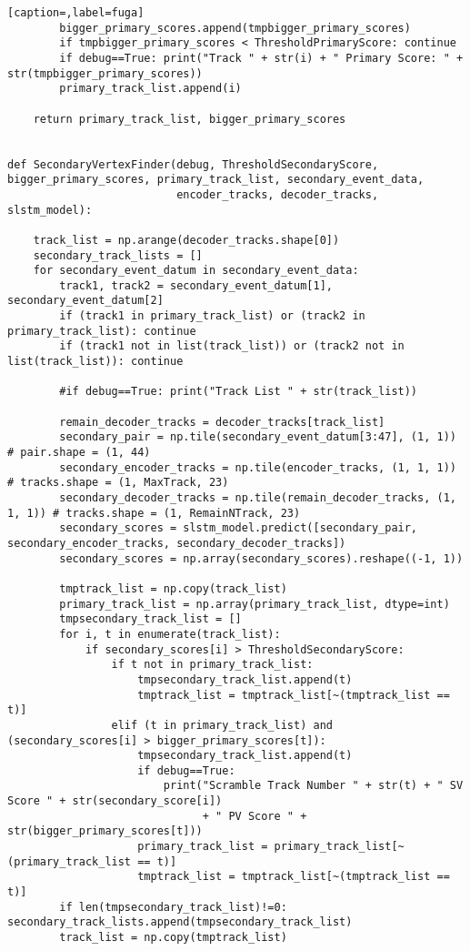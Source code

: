 \begin{lstlisting}[caption=,label=fuga]
        bigger_primary_scores.append(tmpbigger_primary_scores)
        if tmpbigger_primary_scores < ThresholdPrimaryScore: continue
        if debug==True: print("Track " + str(i) + " Primary Score: " + str(tmpbigger_primary_scores))
        primary_track_list.append(i)

    return primary_track_list, bigger_primary_scores


def SecondaryVertexFinder(debug, ThresholdSecondaryScore, bigger_primary_scores, primary_track_list, secondary_event_data, 
                          encoder_tracks, decoder_tracks, slstm_model):

    track_list = np.arange(decoder_tracks.shape[0])
    secondary_track_lists = []
    for secondary_event_datum in secondary_event_data:
        track1, track2 = secondary_event_datum[1], secondary_event_datum[2]
        if (track1 in primary_track_list) or (track2 in primary_track_list): continue
        if (track1 not in list(track_list)) or (track2 not in list(track_list)): continue

        #if debug==True: print("Track List " + str(track_list))
        
        remain_decoder_tracks = decoder_tracks[track_list]
        secondary_pair = np.tile(secondary_event_datum[3:47], (1, 1)) # pair.shape = (1, 44)
        secondary_encoder_tracks = np.tile(encoder_tracks, (1, 1, 1)) # tracks.shape = (1, MaxTrack, 23)
        secondary_decoder_tracks = np.tile(remain_decoder_tracks, (1, 1, 1)) # tracks.shape = (1, RemainNTrack, 23)
        secondary_scores = slstm_model.predict([secondary_pair, secondary_encoder_tracks, secondary_decoder_tracks])
        secondary_scores = np.array(secondary_scores).reshape((-1, 1))

        tmptrack_list = np.copy(track_list)
        primary_track_list = np.array(primary_track_list, dtype=int)
        tmpsecondary_track_list = []
        for i, t in enumerate(track_list):
            if secondary_scores[i] > ThresholdSecondaryScore:
                if t not in primary_track_list:
                    tmpsecondary_track_list.append(t)
                    tmptrack_list = tmptrack_list[~(tmptrack_list == t)]
                elif (t in primary_track_list) and (secondary_scores[i] > bigger_primary_scores[t]):
                    tmpsecondary_track_list.append(t)
                    if debug==True:
                        print("Scramble Track Number " + str(t) + " SV Score " + str(secondary_score[i]) 
                              + " PV Score " + str(bigger_primary_scores[t]))
                    primary_track_list = primary_track_list[~(primary_track_list == t)]
                    tmptrack_list = tmptrack_list[~(tmptrack_list == t)]
        if len(tmpsecondary_track_list)!=0: secondary_track_lists.append(tmpsecondary_track_list)
        track_list = np.copy(tmptrack_list)


\end{lstlisting}
